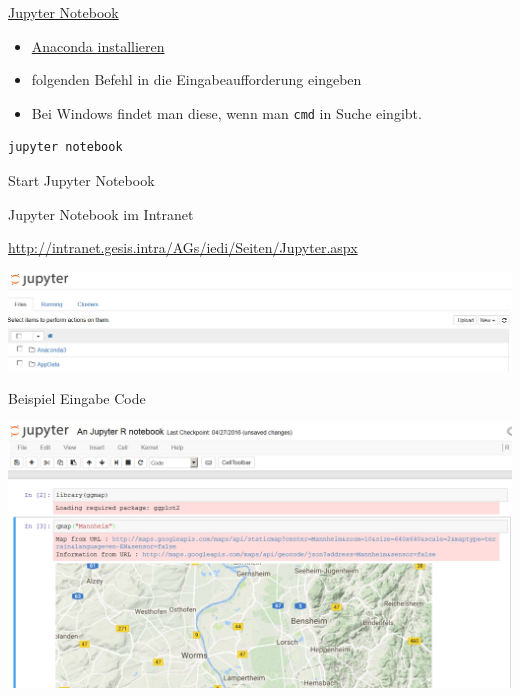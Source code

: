 \documentclass[ignorenonframetext,]{beamer}
\providecommand{\tightlist}{%
\setlength{\itemsep}{0pt}\setlength{\parskip}{0pt}}
\begin{document}
\begin{frame}[fragile]{\href{http://jupyter.readthedocs.io/en/latest/install.html}{Jupyter
Notebook}}

\begin{itemize}
\tightlist
\item
  \href{https://docs.continuum.io/anaconda/install}{Anaconda
  installieren}
\item
  folgenden Befehl in die Eingabeaufforderung eingeben
\item
  Bei Windows findet man diese, wenn man \texttt{cmd} in Suche eingibt.
\end{itemize}

\begin{verbatim}
jupyter notebook
\end{verbatim}

\end{frame}

\begin{frame}{Start Jupyter Notebook}

\begin{block}{Jupyter Notebook im Intranet}

\url{http://intranet.gesis.intra/AGs/iedi/Seiten/Jupyter.aspx}

\includegraphics{./tex2pdf.956/8aa3665d272439dafa950831569516799b69fe48.png}

\end{block}

\end{frame}

\begin{frame}{Beispiel Eingabe Code}

\includegraphics{./tex2pdf.956/9682add0bb5b6be6c5b163a305f44befb1c85ce8.png}

\end{frame}
\end{document}
